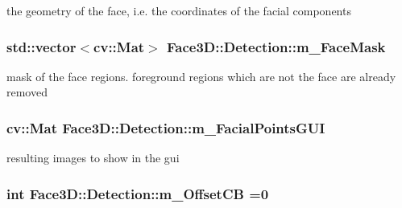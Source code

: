 the geometry of the face, i.\+e. the coordinates of the facial components 

\subsubsection[{\texorpdfstring{m\+\_\+\+Face\+Mask}{m_FaceMask}}]{\setlength{\rightskip}{0pt plus 5cm}std\+::vector$<$cv\+::\+Mat$>$ Face3\+D\+::\+Detection\+::m\+\_\+\+Face\+Mask\hspace{0.3cm}{\ttfamily [private]}}\hypertarget{class_face3_d_1_1_detection_a4dff33b175f5b2aff949db62e4c95b88}{}\label{class_face3_d_1_1_detection_a4dff33b175f5b2aff949db62e4c95b88}


mask of the face regions. foreground regions which are not the face are already removed 

\subsubsection[{\texorpdfstring{m\+\_\+\+Facial\+Points\+G\+UI}{m_FacialPointsGUI}}]{\setlength{\rightskip}{0pt plus 5cm}cv\+::\+Mat Face3\+D\+::\+Detection\+::m\+\_\+\+Facial\+Points\+G\+UI\hspace{0.3cm}{\ttfamily [private]}}\hypertarget{class_face3_d_1_1_detection_a7e74ffc6d6f1835f6eceac7b0609012c}{}\label{class_face3_d_1_1_detection_a7e74ffc6d6f1835f6eceac7b0609012c}
resulting images to show in the gui 
\subsubsection[{\texorpdfstring{m\+\_\+\+Offset\+CB}{m_OffsetCB}}]{\setlength{\rightskip}{0pt plus 5cm}int Face3\+D\+::\+Detection\+::m\+\_\+\+Offset\+CB =0\hspace{0.3cm}{\ttfamily [private]}}\hypertarget{class_face3_d_1_1_detection_aa8e12b00e14ee4ef67c7316163625ac4}{}\label{class_face3_d_1_1_detection_aa8e12b00e14ee4ef67c7316163625ac4}

